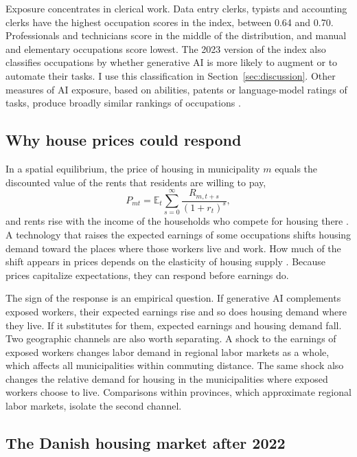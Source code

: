 \documentclass[12pt]{article}
\begin{document}
Exposure concentrates in clerical work. Data entry clerks, typists and accounting clerks have the highest occupation scores in the index, between 0.64 and 0.70. Professionals and technicians score in the middle of the distribution, and manual and elementary occupations score lowest. The 2023 version of the index \citep{gmyrek2023} also classifies occupations by whether generative AI is more likely to augment or to automate their tasks. I use this classification in Section~\ref{sec:discussion}. Other measures of AI exposure, based on abilities, patents or language-model ratings of tasks, produce broadly similar rankings of occupations \citep{felten2021, webb2020, eloundou2024}.

\subsection{Why house prices could respond}

In a spatial equilibrium, the price of housing in municipality $m$ equals the discounted value of the rents that residents are willing to pay,
\begin{equation}
P_{mt} = \mathbb{E}_t \sum_{s=0}^{\infty} \frac{R_{m,t+s}}{(1+r_t)^s},
\end{equation}
and rents rise with the income of the households who compete for housing there \citep{roback1982, moretti2011}. A technology that raises the expected earnings of some occupations shifts housing demand toward the places where those workers live and work. How much of the shift appears in prices depends on the elasticity of housing supply \citep{glaeser2008, saiz2010}. Because prices capitalize expectations, they can respond before earnings do.

The sign of the response is an empirical question. If generative AI complements exposed workers, their expected earnings rise and so does housing demand where they live. If it substitutes for them, expected earnings and housing demand fall. Two geographic channels are also worth separating. A shock to the earnings of exposed workers changes labor demand in regional labor markets as a whole, which affects all municipalities within commuting distance. The same shock also changes the relative demand for housing in the municipalities where exposed workers choose to live. Comparisons within provinces, which approximate regional labor markets, isolate the second channel.

\subsection{The Danish housing market after 2022}
\end{document}
